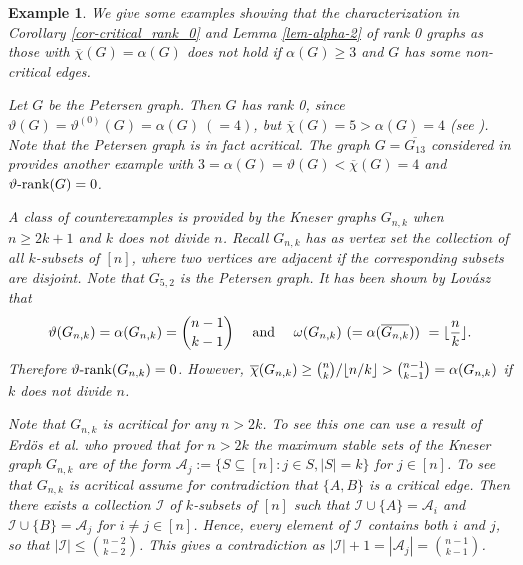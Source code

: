 \documentclass[11pt]{article}
\DeclarePairedDelimiter\floor{\lfloor}{\rfloor}
\newtheorem{example}[theorem]{Example}
\numberwithin{equation}{section}
\newcommand{\rrank}{\vartheta\text{\rm -rank}}
\begin{document}
\begin{example}\label{ex-Petersen}
We  give some examples  showing that   the characterization in Corollary \ref{cor-critical_rank_0} and Lemma \ref{lem-alpha-2} of rank 0 graphs as those with $\overline \chi(G)=\alpha(G)$ does not hold if $\alpha(G)\ge 3$ and $G$ has some non-critical edges.


Let $G$ be the Petersen graph. %
Then $G$ has rank 0, since $\vartheta(G)=\vartheta^{(0)}(G)=\alpha(G)\ (=4)$,  but $\overline \chi(G)= 5>\alpha(G)=4$ (see  \cite{Lo79}). 
Note  that the Petersen graph is in fact acritical. The graph $G=\overline{G_{13}}$ considered  in \cite{oddities} provides another  example with  $3=\alpha(G)=\vartheta(G) <\overline \chi(G)=4$ and $\rrank(G)=0$.

A class of counterexamples is provided by the Kneser graphs $G_{n,k}$ when $n\ge 2k+1$ and $k$ does not divide $n$. Recall $G_{n,k}$ has as  vertex set  the collection of all $k$-subsets of $[n]$, where two vertices are adjacent if the corresponding subsets are disjoint.  Note that $G_{5,2}$ is the Petersen graph.
 It has been shown by Lov\'asz \cite{Lo79,LovszKnesersCC} that 
$$\vartheta(G_{n,k})=\alpha(G_{n,k})=\binom{n-1}{k-1} \quad \text{ and } \quad \omega(G_{n,k}) \ (=\alpha(\overline{G_{n,k}})) \ =\floor{\frac{n}{k}}.$$
Therefore $\rrank(G_{n,k})=0$. However,  $\overline \chi(G_{n,k}) \ge {n\choose k}/ \floor {n/k} > {n-1\choose k-1}=\alpha(G_{n,k})$ if $k$ does not divide $n$. 

Note that $G_{n,k}$ is acritical for any $n>2k$. To see this one can use a result of Erd\"os et al. \cite{Erdos} who proved that for $n>2k$ the maximum stable sets of the Kneser graph $G_{n,k}$  are of the form $\mathcal{A}_j:=\{  S\subseteq[n]: j\in S, |S|=k\}$ for  $j\in [n]$. 
To see that $G_{n,k}$ is acritical  assume for contradiction that $\{A, B\}$ is a critical edge.  Then there exists a collection  $\mathcal{I}$ of $k$-subsets of $[n]$ such that $\mathcal{I}\cup\{A\}=\mathcal{A}_i$ and $\mathcal{I}\cup \{B\} = \mathcal{A}_j$ for $i\neq j\in[n]$. Hence, every element of $\mathcal{I}$ contains both $i$ and $j$, so that $|\mathcal{I}|\leq \binom{n-2}{k-2}$. This gives a contradiction as $|\mathcal{I}|+1=|\mathcal{A}_j|=\binom{n-1}{k-1}$.
\end{example}
\end{document}
